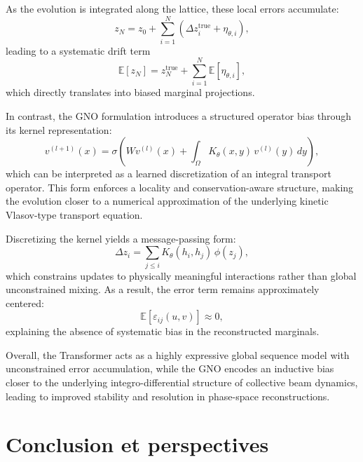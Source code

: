 \documentclass[11pt,a4paper]{article}
\begin{document}
\begin{sloppypar}
As the evolution is integrated along the lattice, these local errors accumulate:
\begin{equation}
z_N = z_0 + \sum_{i=1}^{N} \left(\Delta z_i^{\text{true}} + \eta_{\theta,i}\right),
\end{equation}
leading to a systematic drift term
\begin{equation}
\mathbb{E}[z_N] = z_N^{\text{true}} + \sum_{i=1}^{N} \mathbb{E}[\eta_{\theta,i}],
\end{equation}
which directly translates into biased marginal projections.

In contrast, the GNO formulation introduces a structured operator bias through its kernel representation:
\begin{equation}
v^{(l+1)}(x)
=
\sigma\!\left(
W v^{(l)}(x)
+
\int_{\Omega} K_\theta(x,y)\, v^{(l)}(y)\, dy
\right),
\end{equation}
which can be interpreted as a learned discretization of an integral transport operator. This form enforces a locality and conservation-aware structure, making the evolution closer to a numerical approximation of the underlying kinetic Vlasov-type transport equation.

Discretizing the kernel yields a message-passing form:
\begin{equation}
\Delta z_i
=
\sum_{j \le i} K_\theta(h_i, h_j)\, \phi(z_j),
\end{equation}
which constrains updates to physically meaningful interactions rather than global unconstrained mixing. As a result, the error term remains approximately centered:
\begin{equation}
\mathbb{E}[\varepsilon_{ij}(u,v)] \approx 0,
\end{equation}
explaining the absence of systematic bias in the reconstructed marginals.

Overall, the Transformer acts as a highly expressive global sequence model with unconstrained error accumulation, while the GNO encodes an inductive bias closer to the underlying integro-differential structure of collective beam dynamics, leading to improved stability and resolution in phase-space reconstructions.

\newpage
\section{Conclusion et perspectives}
\label{conclusion}




\newpage
\nocite{*}
\printbibliography %


\end{sloppypar}
\end{document}
